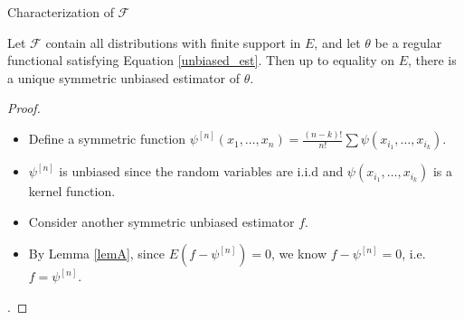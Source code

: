 \documentclass{beamer}
\theoremstyle{definition}
\numberwithin{Def}{section}
\begin{document}
\begin{frame}{Characterization of $\mathcal{F}$}

\begin{theorem}\label{unique}
Let $\mathcal{F}$ contain all distributions with finite support in $E$, and let $\theta$ be a regular functional satisfying Equation \ref{unbiased_est}. Then up to equality on $E$, there is a unique symmetric unbiased estimator of $\theta$.
\end{theorem}
\pause 
\begin{proof}
\begin{itemize}
    \item Define a symmetric function $\psi^{[n]}(x_1, \dotsc, x_n) = \frac{(n-k)!}{n!}\sum \psi(x_{i_1}, \dotsc, x_{i_k})$.
    \item $\psi^{[n]}$ is unbiased since the random variables are i.i.d and $\psi(x_{i_1}, \dotsc, x_{i_k})$ is a kernel function.

    \item Consider another symmetric unbiased estimator $f$.

    \item By Lemma \ref{lemA}, since $E(f - \psi^{[n]}) = 0$, we know $f - \psi^{[n]} = 0$, i.e. $f = \psi^{[n]}$.
\end{itemize}   . 
\end{proof}
\end{frame}
\end{document}
